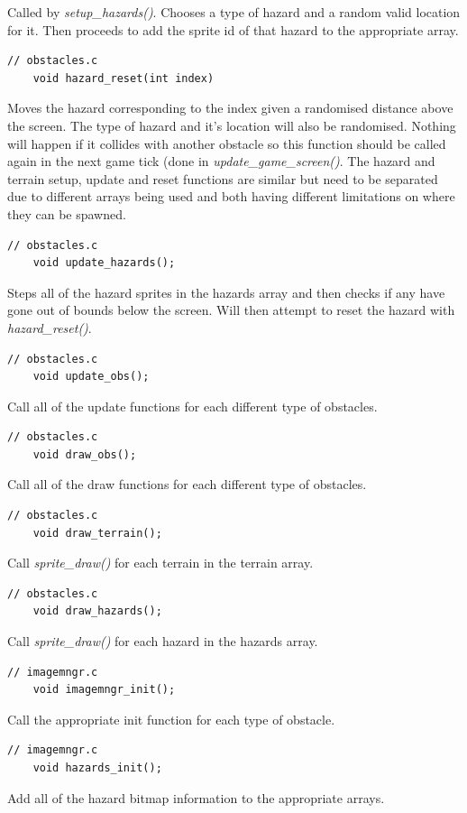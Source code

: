\documentclass{article}
\begin{document}
Called by \emph{setup\_hazards()}. Chooses a type of hazard and a random valid location for it. Then proceeds to add the sprite id of that hazard to the appropriate array.
\begin{lstlisting}[style=CStyle]
	// obstacles.c
	void hazard_reset(int index)
\end{lstlisting}
Moves the hazard corresponding to the index given a randomised distance above the screen. The type of hazard and it's location will also be randomised. Nothing will happen if it collides with another obstacle so this function should be called again in the next game tick (done in \emph{update\_game\_screen()}. The hazard and terrain setup, update and reset functions are similar but need to be separated due to different arrays being used and both having different limitations on where they can be spawned.
\begin{lstlisting}[style=CStyle]
	// obstacles.c
	void update_hazards();
\end{lstlisting}
Steps all of the hazard sprites in the hazards array and then checks if any have gone out of bounds below the screen. Will then attempt to reset the hazard with \emph{hazard\_reset()}.
\newpage
\begin{lstlisting}[style=CStyle]
	// obstacles.c
	void update_obs();
\end{lstlisting}
Call all of the update functions for each different type of obstacles.
\begin{lstlisting}[style=CStyle]
	// obstacles.c
	void draw_obs();
\end{lstlisting}
Call all of the draw functions for each different type of obstacles.
\begin{lstlisting}[style=CStyle]
	// obstacles.c
	void draw_terrain();
\end{lstlisting}
Call \emph{sprite\_draw()} for each terrain in the terrain array.
\begin{lstlisting}[style=CStyle]
	// obstacles.c
	void draw_hazards();
\end{lstlisting}
Call \emph{sprite\_draw()} for each hazard in the hazards array.
\begin{lstlisting}[style=CStyle]
	// imagemngr.c
	void imagemngr_init();
\end{lstlisting}
Call the appropriate init function for each type of obstacle.
\begin{lstlisting}[style=CStyle]
	// imagemngr.c
	void hazards_init();
\end{lstlisting}
Add all of the hazard bitmap information to the appropriate arrays.
\end{document}

